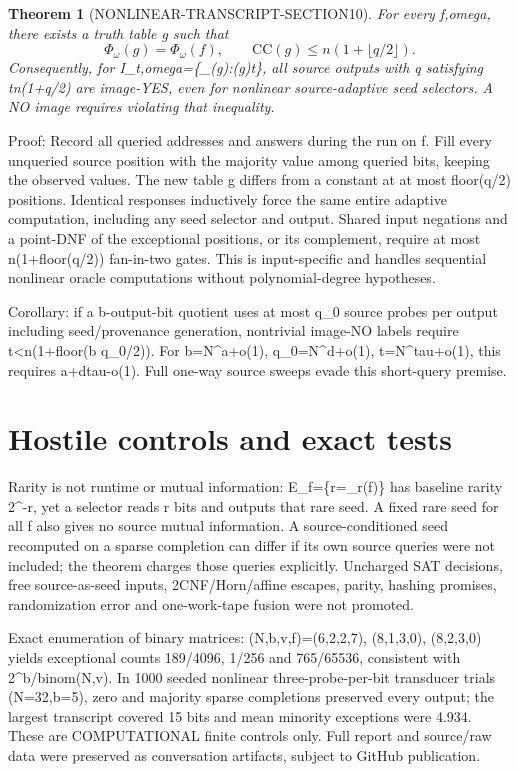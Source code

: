 \documentclass[11pt]{article}
\newtheorem{theorem}{Theorem}
\begin{document}
\begin{theorem}[NONLINEAR-TRANSCRIPT-SECTION10]
For every f,omega, there exists a truth table g such that
\[
\Phi_\omega(g)=\Phi_\omega(f),\qquad
\mathrm{CC}(g)\le n(1+\lfloor q/2\rfloor).
\]
Consequently, for I_{t,omega}=\{\Phi_\omega(g):(g)\le t\}, all source outputs with q satisfying t\ge n(1+\lfloor q/2\rfloor) are image-YES, even for nonlinear source-adaptive seed selectors. A NO image requires violating that inequality.
\end{theorem}
\noindent Proof: Record all queried addresses and answers during the run on f. Fill every unqueried source position with the majority value among queried bits, keeping the observed values. The new table g differs from a constant at at most floor(q/2) positions. Identical responses inductively force the same entire adaptive computation, including any seed selector and output. Shared input negations and a point-DNF of the exceptional positions, or its complement, require at most n(1+floor(q/2)) fan-in-two gates. This is input-specific and handles sequential nonlinear oracle computations without polynomial-degree hypotheses.

\noindent Corollary: if a b-output-bit quotient uses at most q_0 source probes per output including seed/provenance generation, nontrivial image-NO labels require t<n(1+floor(b q_0/2)). For b=N^{a+o(1)}, q_0=N^{d+o(1)}, t=N^{tau+o(1)}, this requires a+d\ge tau-o(1). Full one-way source sweeps evade this short-query premise.

\section*{Hostile controls and exact tests}
Rarity is not runtime or mutual information: E_f=\{r=_r(f)\} has baseline rarity 2^{-r}, yet a selector reads r bits and outputs that rare seed. A fixed rare seed for all f also gives no source mutual information. A source-conditioned seed recomputed on a sparse completion can differ if its own source queries were not included; the theorem charges those queries explicitly. Uncharged SAT decisions, free source-as-seed inputs, 2CNF/Horn/affine escapes, parity, hashing promises, randomization error and one-work-tape fusion were not promoted.

Exact enumeration of binary matrices: (N,b,v,f)=(6,2,2,7), (8,1,3,0), (8,2,3,0) yields exceptional counts 189/4096, 1/256 and 765/65536, consistent with 2^b/binom(N,v). In 1000 seeded nonlinear three-probe-per-bit transducer trials (N=32,b=5), zero and majority sparse completions preserved every output; the largest transcript covered 15 bits and mean minority exceptions were 4.934. These are COMPUTATIONAL finite controls only. Full report and source/raw data were preserved as conversation artifacts, subject to GitHub publication.
\end{document}
